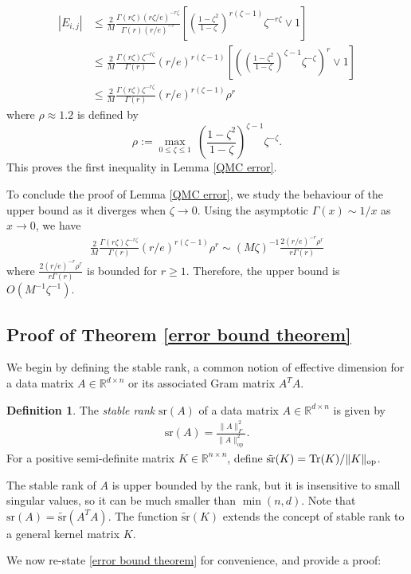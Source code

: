 \documentclass{article}
\theoremstyle{plain}
\theoremstyle{definition}
\newtheorem{definition}[theorem]{Definition}
\theoremstyle{remark}
\newcommand{\eq}[1]{\begin{align*}#1\end{align*}}
\newcommand{\R}{\mathbb{R}}
\newcommand{\Tr}{\textnormal{Tr}}
\begin{document}
\eq{
|E_{i,j}|
&\leq \frac{2}{M} \frac{\Gamma(r\zeta)(r\zeta /e)^{-r\zeta}}{\Gamma(r)(r/e)^{-r}} \left[\left(\frac{1-\zeta^2}{1-\zeta}\right)^{r(\zeta-1)} \zeta^{-r\zeta} \vee 1 \right]  \\
&\leq \frac{2}{M} \frac{\Gamma(r\zeta)\zeta^{-r\zeta}}{\Gamma(r)} (r/e)^{r(\zeta-1)}\left[\left(\left(\frac{1-\zeta^2}{1-\zeta}\right)^{\zeta-1} \zeta^{-\zeta}\right)^r \vee 1 \right] \\
&\leq \frac{2}{M} \frac{\Gamma(r\zeta)\zeta^{-r\zeta}}{\Gamma(r)} (r/e)^{r(\zeta-1)} \rho^r
} 
where $\rho\approx 1.2$ is defined by 
$$\rho := \max_{0\leq \zeta\leq 1}~\left(\frac{1-\zeta^2}{1-\zeta}\right)^{\zeta-1} \zeta^{-\zeta}.$$
This proves the first inequality in Lemma \ref{QMC error}. 

To conclude the proof of Lemma \ref{QMC error}, we study the behaviour of the upper bound as it diverges when $\zeta\to 0$. Using the asymptotic $\Gamma(x)\sim 1/x$ as $x\to0$, we have
\eq{
\frac{2}{M} \frac{\Gamma(r\zeta)\zeta^{-r\zeta}}{\Gamma(r)} (r/e)^{r(\zeta-1)} \rho^r \sim (M\zeta)^{-1} \frac{2(r/e)^{-r} \rho^r}{r\Gamma(r)} 
}
where $\frac{2(r/e)^{-r} \rho^r}{r\Gamma(r)}$ is bounded for $r\ge 1$. Therefore, the upper bound is $O(M^{-1}\zeta^{-1})$. 

\subsection{Proof of Theorem \ref{error bound theorem}}
\label{apdx:proof-of-error-bound}

We begin by defining the stable rank, a common notion of effective dimension for a data matrix $A\in\R^{d\times n}$ or its associated Gram matrix $A^TA$.

\begin{definition}
The \emph{stable rank} $\text{sr}(A)$ of a data matrix $A\in\R^{d\times n}$ is given by
\eq{
\text{sr}(A) = \frac{\|A\|_F^2}{\|A\|^2_\text{op}}.
}
For a positive semi-definite matrix $K\in\R^{n\times n}$, define $\tilde{\text{sr}}(K) = \Tr(K)/\|K\|_\text{op}$.
\end{definition}

The stable rank of $A$ is upper bounded by the rank, but it is insensitive to small singular values, so it can be much smaller than $\min(n,d)$. Note that $\text{sr}(A) = \tilde{\text{sr}}(A^TA)$. The function $\tilde{\text{sr}}(K)$ extends the concept of stable rank to a general kernel matrix $K$. 

We now re-state \cref{error bound theorem} for convenience, and provide a proof:
\end{document}
